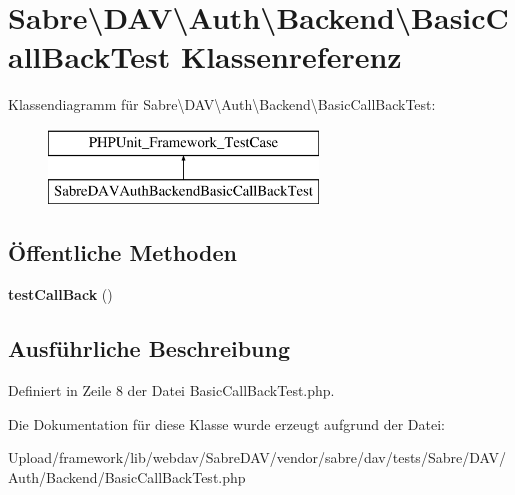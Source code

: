 \hypertarget{class_sabre_1_1_d_a_v_1_1_auth_1_1_backend_1_1_basic_call_back_test}{}\section{Sabre\textbackslash{}D\+AV\textbackslash{}Auth\textbackslash{}Backend\textbackslash{}Basic\+Call\+Back\+Test Klassenreferenz}
\label{class_sabre_1_1_d_a_v_1_1_auth_1_1_backend_1_1_basic_call_back_test}
Klassendiagramm für Sabre\textbackslash{}D\+AV\textbackslash{}Auth\textbackslash{}Backend\textbackslash{}Basic\+Call\+Back\+Test\+:\begin{figure}[H]
\begin{center}
\leavevmode
\includegraphics[height=2.000000cm]{class_sabre_1_1_d_a_v_1_1_auth_1_1_backend_1_1_basic_call_back_test}
\end{center}
\end{figure}
\subsection*{Öffentliche Methoden}
\begin{DoxyCompactItemize}
\item 
\mbox{\label{class_sabre_1_1_d_a_v_1_1_auth_1_1_backend_1_1_basic_call_back_test_aaa730ca24ee845387394afe833c6b37d}} 
{\bfseries test\+Call\+Back} ()
\end{DoxyCompactItemize}


\subsection{Ausführliche Beschreibung}


Definiert in Zeile 8 der Datei Basic\+Call\+Back\+Test.\+php.



Die Dokumentation für diese Klasse wurde erzeugt aufgrund der Datei\+:\begin{DoxyCompactItemize}
\item 
Upload/framework/lib/webdav/\+Sabre\+D\+A\+V/vendor/sabre/dav/tests/\+Sabre/\+D\+A\+V/\+Auth/\+Backend/Basic\+Call\+Back\+Test.\+php\end{DoxyCompactItemize}
